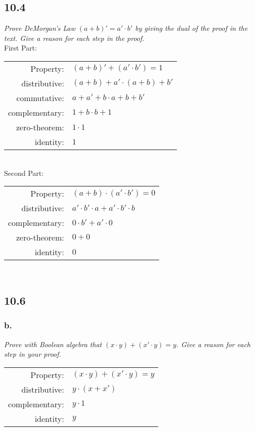 \documentclass[a4paper,man,natbib]{apa6}
\begin{document}
\subsection{10.4}
\emph{Prove DeMorgan’s Law $ (𝑎+𝑏)′ = 𝑎′ \cdot 𝑏′ $ by giving the dual of the proof in the text. Give a reason for each step in the proof.} \\
First Part: \\
\begin{tabular}{r|l}
	Property: & $ (a+b)'+(a'\cdot b') = 1 $ \\
	distributive: & $ (a+b)+a'\cdot (a+b)+b' $ \\
	commutative: & $ a+a'+b\cdot a+b+b' $ \\
	complementary: & $ 1+b\cdot b+1 $ \\
	zero-theorem: & $ 1 \cdot 1 $ \\
	identity: & $ 1 $ \\
\end{tabular}\\
Second Part: \\
\begin{tabular}{r|l}
	Property: & $ (a+b)\cdot(a'\cdot b')=0 $ \\
	distributive: & $ a'\cdot b' \cdot a+a'\cdot b'\cdot b $ \\
	complementary: & $ 0\cdot b'+a'\cdot 0 $ \\
	zero-theorem: & $ 0+0 $ \\
	identity: & $0$ \\
\end{tabular}\\

\subsection{10.6}
\subsubsection{b.}
\emph{Prove with Boolean algebra that $ (𝑥 \cdot 𝑦) + (𝑥′ \cdot 𝑦) = 𝑦 $. Give a reason for each step in your proof.}\\
\begin{tabular}{r|l}
	Property: & $ (x\cdot y)+(x'\cdot y) = y $ \\
	distributive: & $ y\cdot(x+x') $ \\
	complementary: & $ y\cdot 1 $ \\
	identity: & $ y $ \\
\end{tabular}
\clearpage
\end{document}
